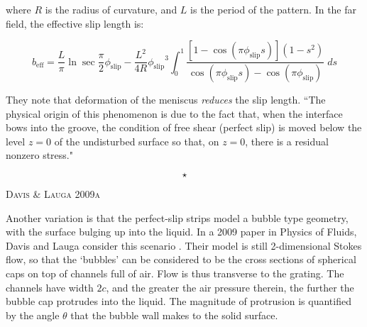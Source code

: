 \documentclass[a4paper]{report}
\newcommand{\beff}{\ensuremath{b_{\mathrm{eff}}}}
\newcommand{\phislip}{\ensuremath{\phi_{\mathrm{slip}}}}
\newcommand{\sep}{\begin{equation*} \star \end{equation*}}
\newcommand{\paper}[1]
         {\colorbox[gray]{0.8}{ \textsc{#1}}
         
         }
\begin{document}
where $R$ is the radius of curvature, and $L$ is the period of the pattern.  In the far field, the effective slip length is:

\[ \beff= \frac{L}{\pi}	\ln \sec \frac{\pi}{2} \phislip - \frac{L^2}{4R}\phislip^3 \int_0^1 
\frac{[1-\cos(\pi\phislip s)] (1-s^2) }{\cos(\pi\phislip s) - \cos(\pi\phislip)}
\; ds \]

They note that deformation of the meniscus \emph{reduces} the slip length. ``The physical origin of this phenomenon is due to the fact that, when the interface bows into the groove, the condition of free shear (perfect slip) is moved below the level $z=0$ of the undisturbed surface so that, on $z=0$, there is a residual nonzero stress."

\begin{center}
\end{center}

\sep

\paper{Davis \& Lauga 2009a}
Another variation is that the perfect-slip strips model a bubble type geometry, with the surface bulging up into the liquid.  In a 2009 paper in Physics of Fluids, Davis and Lauga consider this scenario \cite{DavisLauga2009a}.  Their model is still 2-dimensional Stokes flow, so that the `bubbles' can be considered to be the cross sections of spherical caps on top of channels full of air. Flow is thus transverse to the grating.  The channels have width $2c$, and the greater the air pressure therein, the further the bubble cap protrudes into the liquid.  The magnitude of protrusion is quantified by the angle $\theta$ that the bubble wall makes to the solid surface.
\end{document}
